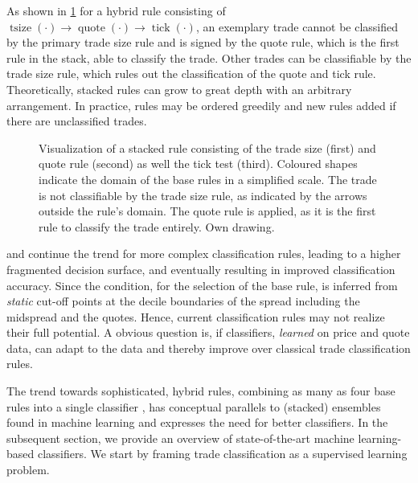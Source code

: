 As shown in \cref{fig:stacking-algo} for a hybrid rule consisting of $\operatorname{tsize}(\cdot) \to \operatorname{quote}(\cdot) \to \operatorname{tick}(\cdot)$, an exemplary trade cannot be classified by the primary trade size rule and is signed by the quote rule, which is the first rule in the stack, able to classify the trade. Other trades can be classifiable by the trade size rule, which rules out the classification of the quote and tick rule. Theoretically, stacked rules can grow to great depth with an arbitrary arrangement. In practice, rules may be ordered greedily and new rules added if there are unclassified trades.

\begin{figure}[ht!]
\begin{center}
  
\end{center}
\caption[Visualization Of A Stacked Rules]{Visualization of a stacked rule consisting of the trade size (first) and quote rule (second) as well the tick test (third). Coloured shapes indicate the domain of the base rules in a simplified scale. The trade is not classifiable by the trade size rule, as indicated by the arrows outside the rule's domain. The quote rule is applied, as it is the first rule to classify the trade entirely. Own drawing.}
\label{fig:stacking-algo}
\end{figure}

\textcite[][3811]{chakrabartyTradeClassificationAlgorithms2007} and \textcite[][18]{grauerOptionTradeClassification2022} continue the trend for more complex classification rules, leading to a higher fragmented decision surface, and eventually resulting in improved classification accuracy. Since the condition, for the selection of the base rule, is inferred from \emph{static} cut-off points at the decile boundaries of the spread including the midspread and the quotes. Hence, current classification rules may not realize their full potential. A obvious question is, if classifiers, \emph{learned} on price and quote data, can adapt to the data and thereby improve over classical trade classification rules.

The trend towards sophisticated, hybrid rules, combining as many as four base rules into a single classifier \autocite[cp.][18]{grauerOptionTradeClassification2022}, has conceptual parallels to (stacked) ensembles found in machine learning and expresses the need for better classifiers. In the subsequent section, we provide an overview of state-of-the-art machine learning-based classifiers. We start by framing trade classification as a supervised learning problem.

